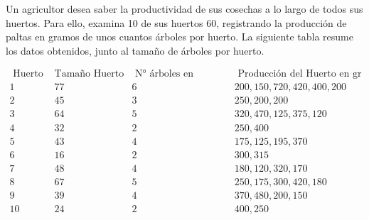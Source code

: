 
\addpoints
\question[30] Un agricultor desea saber la productividad de sus cosechas a lo largo de todos sus huertos. Para ello, examina 10 de sus huertos 60, registrando la producción de paltas en gramos de unos cuantos árboles por huerto. La siguiente tabla resume los datos obtenidos, junto al tamaño de árboles por huerto.

$$\begin{array}{cccl}
\text { Huerto } & \text{Tamaño Huerto }
 & \text { N° árboles en Muestra} & \text { Producción del Huerto en gr} \\
\hline 
1 & 77 & 6 & 200,150,720,420,400,200 \\
2 & 45 & 3 & 250,200,200 \\
3 & 64 & 5 & 320,470,125,375,120 \\
4 & 32 & 2 & 250,400 \\
5 & 43 & 4 & 175,125,195,370 \\
6 & 16 & 2 & 300,315 \\
7 & 48 & 4 & 180,120,320,170 \\
8 & 67 & 5 & 250,175,300,420,180 \\
9 & 39 & 4 & 370,480,200,150 \\
10 & 24 & 2 & 400,250
\end{array}$$
\noaddpoints
{}

